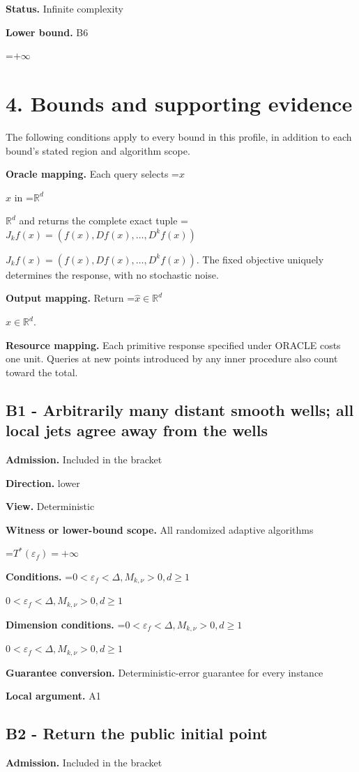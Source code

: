 \documentclass[10pt,a4paper]{article}
\newcommand{\AtlasMath}[1]{\par\begingroup\centering\setbox0=\hbox{$\displaystyle #1$}\ifdim\wd0>1.4\linewidth\typeout{ATLAS WIDE FORMULA: \the\wd0}\fi\ifdim\wd0>\linewidth\resizebox{\linewidth}{!}{\box0}\else\box0\fi\par\endgroup}
\newcommand{\AtlasInlineMath}[1]{\begingroup\setbox0=\hbox{$#1$}\ifdim\wd0>.4\linewidth\endgroup\AtlasMath{#1}\else\endgroup$#1$\fi}
\begin{document}
\textbf{Status.} Infinite complexity

\textbf{Lower bound.} B6

\AtlasMath{+\infty}
\section{4. Bounds and supporting evidence}
The following conditions apply to every bound in this profile, in addition to each bound's stated region and algorithm scope.

\textbf{Oracle mapping.} Each query selects \AtlasInlineMath{x} in \AtlasInlineMath{\mathbb{R}^d} and returns the complete exact tuple \AtlasInlineMath{J_{k}f(x)=(f(x),Df(x),\ldots,D^{k}f(x))}. The fixed objective uniquely determines the response, with no stochastic noise.

\textbf{Output mapping.} Return \AtlasInlineMath{\widehat{x}\in \mathbb{R}^d}.

\textbf{Resource mapping.} Each primitive response specified under ORACLE costs one unit. Queries at new points introduced by any inner procedure also count toward the total.

\subsection{B1 - Arbitrarily many distant smooth wells; all local jets agree away from the wells}
\textbf{Admission.} Included in the bracket

\textbf{Direction.} lower

\textbf{View.} Deterministic

\textbf{Witness or lower-bound scope.} All randomized adaptive algorithms

\AtlasMath{T^*(\varepsilon_f)=+\infty}
\textbf{Conditions.} \AtlasInlineMath{0<\varepsilon_f<\Delta,M_{k,\nu}>0,d\ge 1}

\textbf{Dimension conditions.} \AtlasInlineMath{0<\varepsilon_f<\Delta,M_{k,\nu}>0,d\ge 1}

\textbf{Guarantee conversion.} Deterministic-error guarantee for every instance

\textbf{Local argument.} A1

\subsection{B2 - Return the public initial point}
\textbf{Admission.} Included in the bracket
\end{document}
